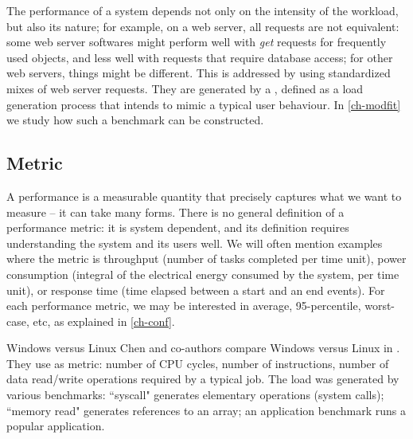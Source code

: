 The performance of a system depends not only on the intensity of the
workload, but also its nature; for example, on a web server, all
requests are not equivalent: some web server softwares might perform
well with \emph{get} requests for frequently used objects, and less
well with requests that require database access; for other web
servers, things might be different. This is addressed by using
standardized mixes of web server requests. They are generated by a
, defined as a load generation process that intends to
mimic a typical user behaviour. In \cref{ch-modfit} we study how
such a benchmark can be constructed.

\subsection{Metric}
\label{metric} A performance  is a measurable
quantity that precisely captures what we want to measure -- it
can take many forms. There is no general definition of a
performance metric: it is system dependent, and its definition
requires understanding the system and its users well. We will
often mention examples where the metric is throughput (number
of tasks completed per time unit), power consumption (integral
of the electrical energy consumed by the system, per time
unit), or response time (time elapsed between a start and an
end events). For each performance metric, we may be interested
in average, 95-percentile, worst-case, etc, as explained in
\cref{ch-conf}.

\begin{ex}{Windows versus Linux}
Chen and co-authors compare Windows versus Linux in
\cite{chen1995mpp}. They use as metric: number of CPU cycles, number
of instructions, number of data read/write operations required by a
typical job. The load was generated by various benchmarks:
``syscall" generates elementary operations (system calls); ``memory
read" generates references to an array;  an application benchmark
runs a popular application.
\end{ex}


